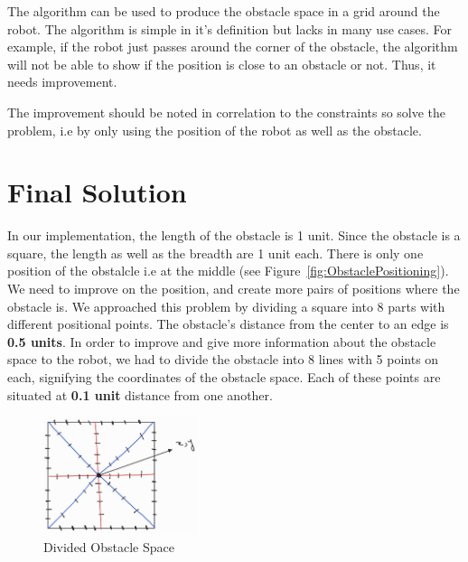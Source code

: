 The algorithm can be used to produce the obstacle space in a grid around the robot. The algorithm is simple in it's definition but lacks in many use cases.
For example, if the robot just passes around the corner of the obstacle, the algorithm will not be able to show if the position is close to an obstacle or not.
Thus, it needs improvement. 

The improvement should be noted in correlation to the constraints so solve the problem, i.e by only using the position of the robot as well as the obstacle.

\section{Final Solution}\label{finalsol}
In our implementation, the length of the obstacle is 1 unit. Since the obstacle is a square, the length as well as the breadth are 1 unit each.
There is only one position of the obstalcle i.e at the middle (see Figure~\ref{fig:ObstaclePositioning}). We need to improve on the position, and create more pairs of positions where the obstacle is.
We approached this problem by dividing a square into 8 parts with different positional points. The obstacle's distance from the center to an edge is \textbf{0.5 units}.
In order to improve and give more information about the obstacle space to the robot, we had to divide the obstacle into 8 lines with 5 points on each, signifying the coordinates of the obstacle space.
Each of these points are situated at \textbf{0.1 unit} distance from one another. 

\begin{figure}[th]
    \centering
    \includegraphics[width=0.4\textwidth]{Figures/improved-obstacle-space.jpg}
    \decoRule
    \caption[]{Divided Obstacle Space}
    \label{fig:ObstacleSpaceDivided}
\end{figure}

